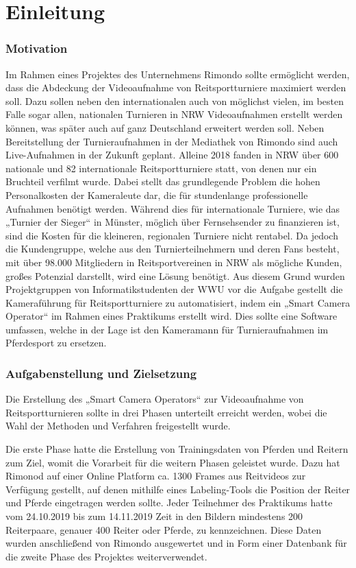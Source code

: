 \chapter{Einleitung}


\subsection*{Motivation}

Im Rahmen eines Projektes des Unternehmens Rimondo sollte ermöglicht werden, dass die Abdeckung der Videoaufnahme von Reitsportturniere maximiert werden soll. Dazu sollen neben den internationalen auch von möglichst vielen, im besten Falle sogar allen, nationalen Turnieren in NRW Videoaufnahmen erstellt werden können, was später auch auf ganz Deutschland erweitert werden soll. Neben Bereitstellung der Turnieraufnahmen in der Mediathek von Rimondo sind auch Live-Aufnahmen in der Zukunft geplant. Alleine 2018 fanden in NRW über 600 nationale und 82 internationale Reitsportturniere statt, von denen nur ein Bruchteil verfilmt wurde.
Dabei stellt das grundlegende Problem die hohen Personalkosten der Kameraleute dar, die für stundenlange professionelle Aufnahmen benötigt werden. Während dies für internationale Turniere, wie das „Turnier der Sieger“ in Münster, möglich über Fernsehsender zu finanzieren ist, sind die Kosten für die kleineren, regionalen Turniere nicht rentabel. Da jedoch die Kundengruppe, welche aus den Turnierteilnehmern und deren Fans besteht, mit über 98.000 Mitgliedern in Reitsportvereinen in NRW als mögliche Kunden, großes Potenzial darstellt, wird eine Lösung benötigt. Aus diesem Grund wurden Projektgruppen von Informatikstudenten der WWU vor die Aufgabe gestellt die Kameraführung für Reitsportturniere zu automatisiert, indem ein „Smart Camera Operator“ im Rahmen eines Praktikums erstellt wird. Dies sollte eine Software umfassen, welche in der Lage ist den Kameramann für Turnieraufnahmen im Pferdesport zu ersetzen.



\subsection*{Aufgabenstellung und Zielsetzung}

Die Erstellung des „Smart Camera Operators“ zur Videoaufnahme von Reitsportturnieren sollte in drei Phasen unterteilt erreicht werden, wobei die Wahl der Methoden und Verfahren freigestellt wurde.

Die erste Phase hatte die Erstellung von Trainingsdaten von Pferden und Reitern zum Ziel, womit die Vorarbeit für die weitern Phasen geleistet wurde. Dazu hat Rimonod auf einer Online Platform ca. 1300 Frames aus Reitvideos zur Verfügung gestellt, auf denen mithilfe eines Labeling-Tools die Position der Reiter und Pferde eingetragen werden sollte. Jeder Teilnehmer des Praktikums hatte vom 24.10.2019 bis zum 14.11.2019 Zeit in den Bildern mindestens 200 Reiterpaare, genauer 400 Reiter oder Pferde, zu kennzeichnen. Diese Daten wurden anschließend von Rimondo ausgewertet und in Form einer Datenbank für die zweite Phase des Projektes weiterverwendet. 

